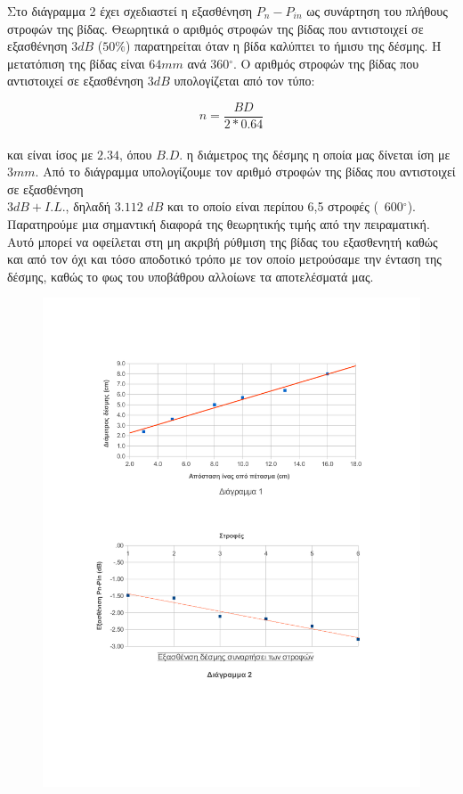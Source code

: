 \documentclass[a4paper,11pt,titlepage]{article}
\makeatletter
\newcommand{\degrees}{\ensuremath{^\circ}}
\def\maxwidth{
\ifdim\Gin@nat@width>\linewidth
\linewidth
\else
\Gin@nat@width
\fi
    }
\makeatother
\begin{document}
Στο διάγραμμα 2 έχει σχεδιαστεί η εξασθένηση $P_n - P_{in}$ ως συνάρτηση του πλήθους στροφών της βίδας. Θεωρητικά ο αριθμός στροφών της βίδας που αντιστοιχεί σε εξασθένηση $3dB$ ($50\%$) παρατηρείται όταν η βίδα καλύπτει το ήμισυ της δέσμης. Η μετατόπιση της βίδας είναι $64mm$ ανά $360\degrees$. Ο αριθμός στροφών της βίδας που αντιστοιχεί σε εξασθένηση $3dB$ υπολογίζεται από τον τύπο:

\begin{equation}
n = \frac{BD}{2*0.64}
\end{equation}\\

και είναι ίσος με $2.34$, όπου $B.D.$ η διάμετρος της δέσμης η οποία μας δίνεται ίση με $3mm$.
Από το διάγραμμα υπολογίζουμε τον αριθμό στροφών της βίδας που αντιστοιχεί σε εξασθένηση \\ 
$3dB + I.L.$, δηλαδή $3.112$ $dB$ και το οποίο είναι περίπου 6,5 στροφές (~600\degrees). \\

Παρατηρούμε μια σημαντική διαφορά της θεωρητικής τιμής από την πειραματική. Αυτό μπορεί να οφείλεται στη μη ακριβή ρύθμιση της βίδας του εξασθενητή καθώς και από τον όχι και τόσο αποδοτικό τρόπο με τον οποίο μετρούσαμε την ένταση της δέσμης, καθώς το φως του υποβάθρου αλλοίωνε τα αποτελέσματά μας.
\newpage

\begin{figure} [H] 
\centering
\includegraphics[width=\maxwidth]{graphs.pdf}
\end{figure}
\end{document}
